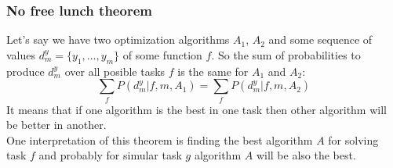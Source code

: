 \subsubsection*{No free lunch theorem}

Let's say we have two optimization algorithms $A_1$, $A_2$ and some sequence of values $d_m^y=\{y_1,\ldots,y_m\}$ of some function $f$. So the sum of probabilities to produce $d_m^y$ over all posible tasks $f$ is the same for $A_1$ and $A_2$:
$$\sum\limits_{f}P(d_m^y|f,m,A_1)=\sum\limits_{f}P(d_m^y|f,m,A_2)$$
It means that if one algorithm is the best in one task then other algorithm will be better in another.\\
One interpretation of this theorem is finding the best algorithm $A$ for solving task $f$ and probably for simular task $g$ algorithm $A$ will be also the best.